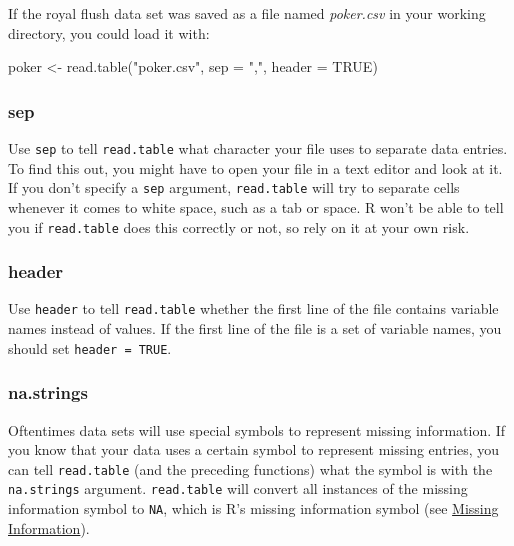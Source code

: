 \documentclass[
  letterpaper,
  DIV=11,
  numbers=noendperiod]{scrbook}
\newenvironment{Shaded}{\begin{snugshade}}{\end{snugshade}}
\newcommand{\AttributeTok}[1]{\textcolor[rgb]{0.40,0.45,0.13}{#1}}
\newcommand{\ConstantTok}[1]{\textcolor[rgb]{0.56,0.35,0.01}{#1}}
\newcommand{\FunctionTok}[1]{\textcolor[rgb]{0.28,0.35,0.67}{#1}}
\newcommand{\NormalTok}[1]{\textcolor[rgb]{0.00,0.23,0.31}{#1}}
\newcommand{\OtherTok}[1]{\textcolor[rgb]{0.00,0.23,0.31}{#1}}
\newcommand{\StringTok}[1]{\textcolor[rgb]{0.13,0.47,0.30}{#1}}
\begin{document}
If the royal flush data set was saved as a file named \emph{poker.csv}
in your working directory, you could load it with:

\begin{Shaded}
\begin{Highlighting}[]
\NormalTok{poker }\OtherTok{\textless{}{-}} \FunctionTok{read.table}\NormalTok{(}\StringTok{"poker.csv"}\NormalTok{, }\AttributeTok{sep =} \StringTok{","}\NormalTok{, }\AttributeTok{header =} \ConstantTok{TRUE}\NormalTok{)}
\end{Highlighting}
\end{Shaded}

\subsubsection{sep}\label{sep}

Use \texttt{sep} to tell \texttt{read.table} what character your file
uses to separate data entries. To find this out, you might have to open
your file in a text editor and look at it. If you don't specify a
\texttt{sep} argument, \texttt{read.table} will try to separate cells
whenever it comes to white space, such as a tab or space. R won't be
able to tell you if \texttt{read.table} does this correctly or not, so
rely on it at your own risk.

\subsubsection{header}\label{header}

Use \texttt{header} to tell \texttt{read.table} whether the first line
of the file contains variable names instead of values. If the first line
of the file is a set of variable names, you should set
\texttt{header\ =\ TRUE}.

\subsubsection{na.strings}\label{na.strings}

Oftentimes data sets will use special symbols to represent missing
information. If you know that your data uses a certain symbol to
represent missing entries, you can tell \texttt{read.table} (and the
preceding functions) what the symbol is with the \texttt{na.strings}
argument. \texttt{read.table} will convert all instances of the missing
information symbol to \texttt{NA}, which is R's missing information
symbol (see \hyperref[sec-missing]{Missing Information}).
\end{document}
